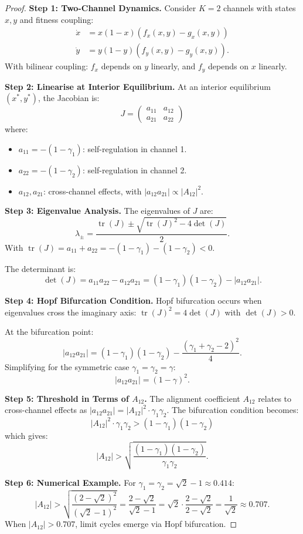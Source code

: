 \documentclass[12pt]{article}
\DeclareMathOperator{\tr}{tr}
\begin{document}
\begin{proof}
\textbf{Step 1: Two-Channel Dynamics.}
Consider $K = 2$ channels with states $x, y$ and fitness coupling:
\begin{align*}
\dot{x} &= x(1-x)(f_x(x, y) - g_x(x, y)) \\
\dot{y} &= y(1-y)(f_y(x, y) - g_y(x, y)).
\end{align*}
With bilinear coupling: $f_x$ depends on $y$ linearly, and $f_y$ depends on $x$ linearly.

\textbf{Step 2: Linearise at Interior Equilibrium.}
At an interior equilibrium $(x^*, y^*)$, the Jacobian is:
\[
J = \begin{pmatrix} a_{11} & a_{12} \\ a_{21} & a_{22} \end{pmatrix}
\]
where:
\begin{itemize}
    \item $a_{11} = -(1 - \gamma_1)$: self-regulation in channel 1.
    \item $a_{22} = -(1 - \gamma_2)$: self-regulation in channel 2.
    \item $a_{12}, a_{21}$: cross-channel effects, with $|a_{12} a_{21}| \propto |A_{12}|^2$.
\end{itemize}

\textbf{Step 3: Eigenvalue Analysis.}
The eigenvalues of $J$ are:
\[
\lambda_{\pm} = \frac{\tr(J) \pm \sqrt{\tr(J)^2 - 4\det(J)}}{2}.
\]
With $\tr(J) = a_{11} + a_{22} = -(1 - \gamma_1) - (1 - \gamma_2) < 0$.

The determinant is:
\[
\det(J) = a_{11} a_{22} - a_{12} a_{21} = (1 - \gamma_1)(1 - \gamma_2) - |a_{12} a_{21}|.
\]

\textbf{Step 4: Hopf Bifurcation Condition.}
Hopf bifurcation occurs when eigenvalues cross the imaginary axis: $\tr(J)^2 = 4\det(J)$ with $\det(J) > 0$.

At the bifurcation point:
\[
|a_{12} a_{21}| = (1 - \gamma_1)(1 - \gamma_2) - \frac{(\gamma_1 + \gamma_2 - 2)^2}{4}.
\]
Simplifying for the symmetric case $\gamma_1 = \gamma_2 = \gamma$:
\[
|a_{12} a_{21}| = (1 - \gamma)^2.
\]

\textbf{Step 5: Threshold in Terms of $A_{12}$.}
The alignment coefficient $A_{12}$ relates to cross-channel effects as $|a_{12} a_{21}| = |A_{12}|^2 \cdot \gamma_1 \gamma_2$. The bifurcation condition becomes:
\[
|A_{12}|^2 \cdot \gamma_1 \gamma_2 > (1 - \gamma_1)(1 - \gamma_2)
\]
which gives:
\[
|A_{12}| > \sqrt{\frac{(1 - \gamma_1)(1 - \gamma_2)}{\gamma_1 \gamma_2}}.
\]

\textbf{Step 6: Numerical Example.}
For $\gamma_1 = \gamma_2 = \sqrt{2} - 1 \approx 0.414$:
\[
|A_{12}| > \sqrt{\frac{(2 - \sqrt{2})^2}{(\sqrt{2} - 1)^2}} = \frac{2 - \sqrt{2}}{\sqrt{2} - 1} = \sqrt{2} \cdot \frac{2 - \sqrt{2}}{2 - \sqrt{2}} = \frac{1}{\sqrt{2}} \approx 0.707.
\]
When $|A_{12}| > 0.707$, limit cycles emerge via Hopf bifurcation.
\end{proof}
\end{document}
